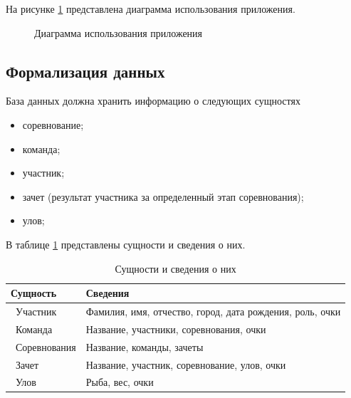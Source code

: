 На рисунке \ref{fig:UseCase} представлена диаграмма использования приложения.

\begin{figure}[h!]
	\caption{Диаграмма использования приложения}
	\label{fig:UseCase}
\end{figure}

\subsection{Формализация данных}

База данных должна хранить информацию о следующих сущностях 

\begin{itemize}[label=---]
	\item соревнование;
	\item команда;
	\item участник;
	\item зачет (результат участника за определенный этап соревнования);
	\item улов;
\end{itemize}

В таблице \ref{decisions} представлены сущности и сведения о них.

\begin{table}[ht!]
	\centering
	\caption{Сущности и сведения о них}
	\label{decisions}
	\begin{tabular}{|p{4.3cm}|p{10.3cm}|}
		\hline
		\textbf{Сущность} & \textbf{Сведения}\\
		\hline 
		\ Участник & Фамилия, имя, отчество, город, дата рождения, роль, очки \\
		\hline 
		\ Команда & Название, участники, соревнования, очки \\
		\hline 
		\ Соревнования & Название, команды, зачеты \\
		\hline 
		\ Зачет & Название, участник, соревнование, улов, очки \\
		\hline 
		\ Улов & Рыба, вес, очки \\
		\hline
	\end{tabular}
\end{table}

